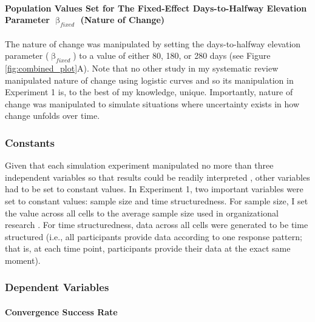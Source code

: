 \documentclass[
12pt, %
twoside,
english]{guelphthesis}
\begin{document}
\hypertarget{population-values-set-for-the-fixed-effect-days-to-halfway-elevation-parameter-upbeta_fixed-nature-of-change}{%
\paragraph{\texorpdfstring{Population Values Set for The Fixed-Effect Days-to-Halfway Elevation Parameter \(\upbeta_{fixed}\) (Nature of Change)}{Population Values Set for The Fixed-Effect Days-to-Halfway Elevation Parameter \textbackslash upbeta\_\{fixed\} (Nature of Change)}}\label{population-values-set-for-the-fixed-effect-days-to-halfway-elevation-parameter-upbeta_fixed-nature-of-change}}

The nature of change was manipulated by setting the days-to-halfway elevation parameter (\(\upbeta_{fixed}\)) to a value of either 80, 180, or 280 days (see Figure \ref{fig:combined_plot}A). Note that no other study in my systematic review manipulated nature of change using logistic curves and so its manipulation in Experiment 1 is, to the best of my knowledge, unique. Importantly, nature of change was manipulated to simulate situations where uncertainty exists in how change unfolds over time.

\hypertarget{constants}{%
\subsubsection{Constants}\label{constants}}

Given that each simulation experiment manipulated no more than three independent variables so that results could be readily interpreted \autocite{halford2005}, other variables had to be set to constant values. In Experiment 1, two important variables were set to constant values: sample size and time structuredness. For sample size, I set the value across all cells to the average sample size used in organizational research \autocite[\emph{n} = 225;][]{bosco2015}. For time structuredness, data across all cells were generated to be time structured (i.e., all participants provide data according to one response pattern; that is, at each time point, participants provide their data at the exact same moment).

\hypertarget{dependent-variables}{%
\subsubsection{Dependent Variables}\label{dependent-variables}}

\hypertarget{convergence}{%
\paragraph{Convergence Success Rate}\label{convergence}}
\end{document}
